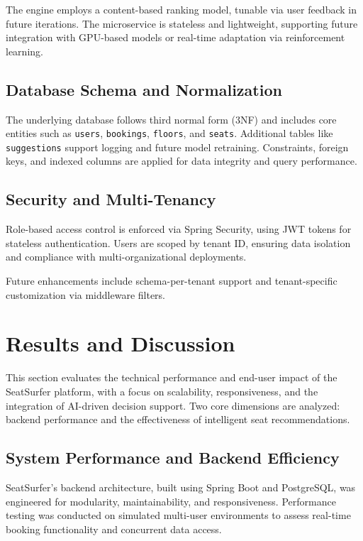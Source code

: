 \documentclass[onecolumn, 12pt]{IEEEtran}
\begin{document}
The engine employs a content-based ranking model, tunable via user feedback in future iterations. The microservice is stateless and lightweight, supporting future integration with GPU-based models or real-time adaptation via reinforcement learning.

\subsection{Database Schema and Normalization}

The underlying database follows third normal form (3NF) and includes core entities such as \texttt{users}, \texttt{bookings}, \texttt{floors}, and \texttt{seats}. Additional tables like \texttt{suggestions} support logging and future model retraining. Constraints, foreign keys, and indexed columns are applied for data integrity and query performance.

\subsection{Security and Multi-Tenancy}

Role-based access control is enforced via Spring Security, using JWT tokens for stateless authentication. Users are scoped by tenant ID, ensuring data isolation and compliance with multi-organizational deployments.

Future enhancements include schema-per-tenant support and tenant-specific customization via middleware filters.

\section{Results and Discussion}

This section evaluates the technical performance and end-user impact of the SeatSurfer platform, with a focus on scalability, responsiveness, and the integration of AI-driven decision support. Two core dimensions are analyzed: backend performance and the effectiveness of intelligent seat recommendations.

\subsection{System Performance and Backend Efficiency}

SeatSurfer's backend architecture, built using Spring Boot and PostgreSQL, was engineered for modularity, maintainability, and responsiveness. Performance testing was conducted on simulated multi-user environments to assess real-time booking functionality and concurrent data access.
\end{document}

